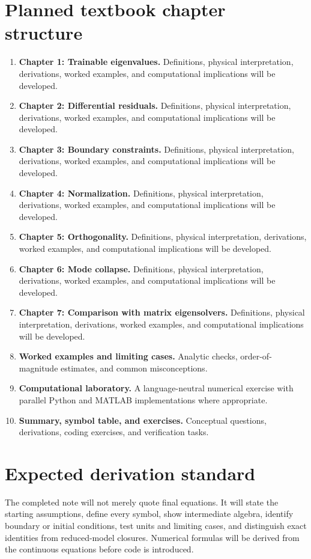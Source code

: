 \documentclass[11pt]{article}
\begin{document}
\section{Planned textbook chapter structure}
\begin{enumerate}[leftmargin=1.8em]
\item \textbf{Chapter 1: Trainable eigenvalues.} Definitions, physical interpretation, derivations, worked examples, and computational implications will be developed.
\item \textbf{Chapter 2: Differential residuals.} Definitions, physical interpretation, derivations, worked examples, and computational implications will be developed.
\item \textbf{Chapter 3: Boundary constraints.} Definitions, physical interpretation, derivations, worked examples, and computational implications will be developed.
\item \textbf{Chapter 4: Normalization.} Definitions, physical interpretation, derivations, worked examples, and computational implications will be developed.
\item \textbf{Chapter 5: Orthogonality.} Definitions, physical interpretation, derivations, worked examples, and computational implications will be developed.
\item \textbf{Chapter 6: Mode collapse.} Definitions, physical interpretation, derivations, worked examples, and computational implications will be developed.
\item \textbf{Chapter 7: Comparison with matrix eigensolvers.} Definitions, physical interpretation, derivations, worked examples, and computational implications will be developed.
\item \textbf{Worked examples and limiting cases.} Analytic checks, order-of-magnitude estimates, and common misconceptions.
\item \textbf{Computational laboratory.} A language-neutral numerical exercise with parallel Python and MATLAB implementations where appropriate.
\item \textbf{Summary, symbol table, and exercises.} Conceptual questions, derivations, coding exercises, and verification tasks.
\end{enumerate}

\section{Expected derivation standard}
The completed note will not merely quote final equations. It will state the starting assumptions, define every symbol, show intermediate algebra, identify boundary or initial conditions, test units and limiting cases, and distinguish exact identities from reduced-model closures. Numerical formulas will be derived from the continuous equations before code is introduced.
\end{document}
